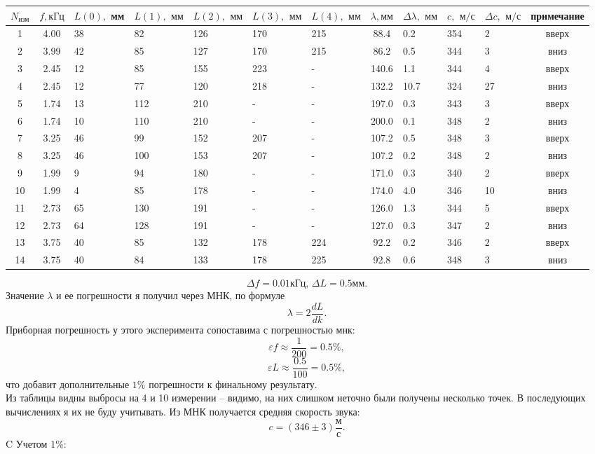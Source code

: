 \begin{center}
\begin{tabular}{|c|c|m{0.8cm}|m{0.8cm}|m{0.8cm}|m{0.8cm}|m{0.8cm}|c|m{0.7cm}|m{0.6cm}|m{0.6cm}|c|}
\hline $N_\text{изм}$&$f, \text{кГц}$&$L(0),$ мм&$L(1),$ $\text{мм}$&$L(2),$ $\text{мм}$&$L(3),$ $\text{мм}$&$L(4),$ $\text{мм}$&$\lambda, \text{мм}$&$\Delta \lambda,$ $\text{мм}$&$c,$ $\text{м}/\text{с}$&$\Delta c,$ $\text{м}/\text{с}$&примечание\\ \hline
1&4.00&38&82&126&170&215&88.4&0.2&354&2&вверх\\ \hline
2&3.99&42&85&127&170&215&86.2&0.5&344&3&вниз\\ \hline
3&2.45&12&85&155&223&-&140.6&1.1&344&4&вверх\\ \hline
4&2.45&12&77&120&218&-&132.2&10.7&324&27&вниз\\ \hline
5&1.74&13&112&210&-&-&197.0&0.3&343&3&вверх\\ \hline
6&1.74&10&110&210&-&-&200.0&0.1&348&2&вниз\\ \hline
7&3.25&46&99&152&207&-&107.2&0.5&348&3&вверх\\ \hline
8&3.25&46&100&153&207&-&107.2&0.2&348&2&вниз\\ \hline
9&1.99&9&94&180&-&-&171.0&0.3&340&2&вверх\\ \hline
10&1.99&4&85&178&-&-&174.0&4.0&346&10&вниз\\ \hline
11&2.73&65&130&191&-&-&126.0&1.3&344&5&вверх\\ \hline
12&2.73&64&128&191&-&-&127.0&0.3&347&2&вниз\\ \hline
13&3.75&40&85&132&178&224&92.2&0.2&346&2&вверх\\ \hline
14&3.75&40&84&133&178&225&92.8&0.6&348&3&вниз\\ \hline
\end{tabular}
\end{center}
$$\Delta f = 0.01\text{кГц},\,\Delta L = 0.5\text{мм}.$$
Значение $\lambda$ и ее погрешности я получил через МНК, по формуле
$$\lambda = 2 \frac{dL}{dk}.$$
Приборная погрешность у этого эксперимента сопоставима с погрешностью мнк:
$$\varepsilon f \approx \frac{1}{200} = 0.5\%,$$
$$\varepsilon L \approx \frac{0.5}{100} = 0.5\%,$$
что добавит дополнительные $1\%$ погрешности к финальному результату.\\
Из таблицы видны выбросы на 4 и 10 измерении -- видимо, на них слишком неточно были получены несколько точек. В последующих вычислениях я их не буду учитывать.
Из МНК получается средняя скорость звука:
$$c = (346\pm3)\frac{\text{м}}{\text{с}}.$$
C Учетом $1\%$:
